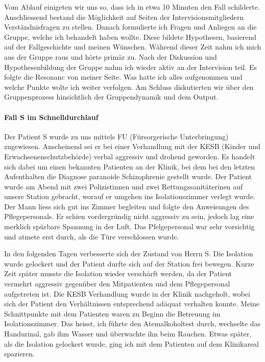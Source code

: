 Vom Ablauf einigeten wir uns so, dass ich in etwa 10 Minuten den Fall schilderte. Anschliessend bestand die Möglichkeit auf Seiten der Intervisionsmitgliedern Verständnisfragen zu stellen. Danach formulierte ich Fragen und Anliegen an die Gruppe, welche ich behandelt haben wollte. Diese bildete Hypothesen, basierend auf der Fallgeschichte und meinen Wünschen. Während dieser Zeit nahm ich mich aus der Gruppe raus und hörte primär zu. Nach der Diskussion und Hypothesenbildung der Gruppe nahm ich wieder aktiv an der Intervision teil. Es folgte die Resonanc von meiner Seite. Was hatte ich alles aufgenommen und welche Punkte wolte ich weiter verfolgen. Am Schluss diskutierten wir über den Gruppenprozess hinsichtlich der Gruppendynamik und dem Output.

\paragraph{Fall S im Schnelldurchlauf}
Der Patient S wurde zu uns mittels FU (Fürsorgerische Unterbringung) zugewiesen. Anscheinend sei er bei einer Verhandlung mit der KESB (Kinder und Erwachsenenschutzbehörde) verbal aggressiv und drohend geworden. Es handelt sich dabei um einen bekannten Patienten an der Klinik, bei dem bei den letzten Aufenthalten die Diagnose paranoide Schizophrenie gestellt wurde. Der Patient wurde am Abend mit zwei Polizistinnen und zwei Rettungssanitäterinen auf unsere Station gebracht, worauf er umgehen ins Isolationszimmer verlegt wurde. Der Mann liess sich gut ins Zimmer begleiten und folgte den Anweisungen des Pflegepersonals. Er schien vordergründig nicht aggressiv zu sein, jedoch lag eine merklich spürbare Spannung in der Luft. Das Pfelgepersonal war sehr vorsichtig und atmete erst durch, als die Türe verschlossen wurde.

In den folgenden Tagen verbesserte sich der Zustand von Herrn S. Die Isolation wurde gelockert und der Patient durfte sich auf der Station frei bewegen. Kurze Zeit später musste die Isolation wieder verschärft werden, da der Patient vermehrt aggressiv gegenüber den Mitpatienten und dem Pflegepersonal aufgetreten ist. Die KESB Verhandlung wurde in der Klinik nachgeholt, wobei sich der Patient den Verhältnissen entsprechend adäquat verhalten konnte. 
Meine Schnittpunkte mit dem Patienten waren zu Beginn die Betreuung im Isolationszimmer. Das heisst, ich führte den Atemalkoholtest durch, wechselte das Handurinal, gab ihm Wasser und überwachte ihn beim Rauchen. Etwas später, als die Isolation gelockert wurde, ging ich mit dem Patienten auf dem Klinikareal spazieren. 

